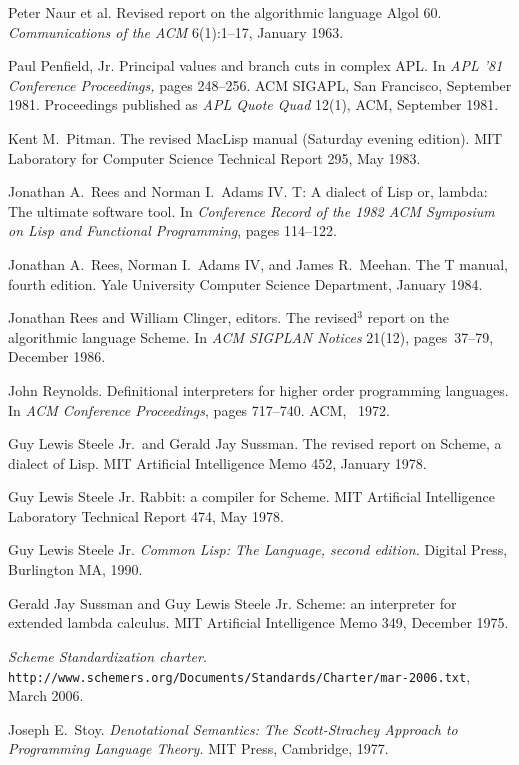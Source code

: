 \begin{thebibliography}{999}
Peter Naur et al.
Revised report on the algorithmic language Algol 60.
{\em Communications of the ACM} 6(1):1--17, January 1963.

Paul Penfield, Jr.
Principal values and branch cuts in complex APL.
In {\em APL '81 Conference Proceedings,} pages 248--256.
ACM SIGAPL, San Francisco, September 1981.
Proceedings published as {\em APL Quote Quad} 12(1), ACM, September 1981.

Kent M.~Pitman.
The revised MacLisp manual (Saturday evening edition).
MIT Laboratory for Computer Science Technical Report 295, May 1983.

Jonathan A.~Rees and Norman I.~Adams IV.
T: A dialect of Lisp or, lambda: The ultimate software tool.
In {\em Conference Record of the 1982 ACM Symposium on Lisp and
  Functional Programming}, pages 114--122.

Jonathan A.~Rees, Norman I.~Adams IV, and James R.~Meehan.
The T manual, fourth edition.
Yale University Computer Science Department, January 1984.

Jonathan Rees and William Clinger, editors.
The revised$^3$ report on the algorithmic language Scheme.
In {\em ACM SIGPLAN Notices} 21(12), pages~37--79, December 1986.

John Reynolds.
Definitional interpreters for higher order programming languages.
In {\em ACM Conference Proceedings}, pages 717--740.
ACM, ~1972.

Guy Lewis Steele Jr.~and Gerald Jay Sussman.
The revised report on Scheme, a dialect of Lisp.
MIT Artificial Intelligence Memo 452, January 1978.

Guy Lewis Steele Jr.
Rabbit: a compiler for Scheme.
MIT Artificial Intelligence Laboratory Technical Report 474, May 1978.

Guy Lewis Steele Jr.
{\em Common Lisp: The Language, second edition.}
Digital Press, Burlington MA, 1990.

Gerald Jay Sussman and Guy Lewis Steele Jr.
Scheme: an interpreter for extended lambda calculus.
MIT Artificial Intelligence Memo 349, December 1975.

{\em Scheme Standardization charter.}
{\tt
  http://www.schemers.org/Documents/Standards/Charter/mar-2006.txt},
March 2006.

Joseph E.~Stoy.
{\em Denotational Semantics: The Scott-Strachey Approach to
  Programming Language Theory.}
MIT Press, Cambridge, 1977.


\end{thebibliography}

